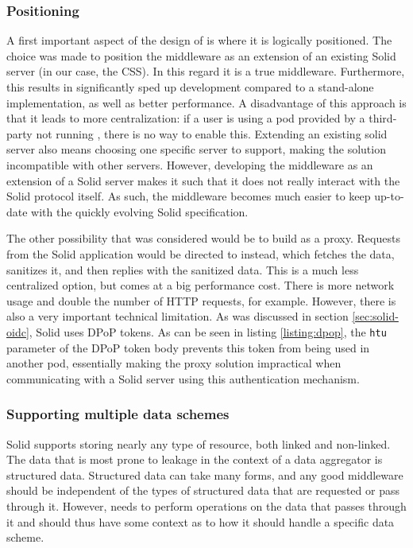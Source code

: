 \subsubsection{Positioning}
A first important aspect of the design of \middleware{} is where it is logically positioned. The choice was made to position the middleware as an extension of an existing Solid server (in our case, the \gls{CSS}). In this regard it is a true middleware. Furthermore, this results in significantly sped up development compared to a stand-alone implementation, as well as better performance. A disadvantage of this approach is that it leads to more centralization: if a user is using a pod provided by a third-party not running \middleware{}, there is no way to enable this. Extending an existing solid server also means choosing one specific server to support, making the solution incompatible with other servers. However, developing the middleware as an extension of a Solid server makes it such that it does not really interact with the Solid protocol itself. As such, the middleware becomes much easier to keep up-to-date with the quickly evolving Solid specification. 

The other possibility that was considered would be to build \middleware{} as a proxy. Requests from the Solid application would be directed to \middleware{} instead, which fetches the data, sanitizes it, and then replies with the sanitized data. This is a much less centralized option, but comes at a big performance cost. There is more network usage and double the number of HTTP requests, for example. However, there is also a very important technical limitation. As was discussed in section \ref{sec:solid-oidc}, Solid uses \gls{DPoP} tokens. As can be seen in listing \ref{listing:dpop}, the \texttt{htu} parameter of the \gls{DPoP} token body prevents this token from being used in another pod, essentially making the proxy solution impractical when communicating with a Solid server using this authentication mechanism.


\subsubsection{Supporting multiple data schemes}
Solid supports storing nearly any type of resource, both linked and non-linked. The data that is most prone to leakage in the context of a data aggregator is structured data. Structured data can take many forms, and any good middleware should be independent of the types of structured data that are requested or pass through it. However, \middleware{} needs to perform operations on the data that passes through it and should thus have some context as to how it should handle a specific data scheme.

